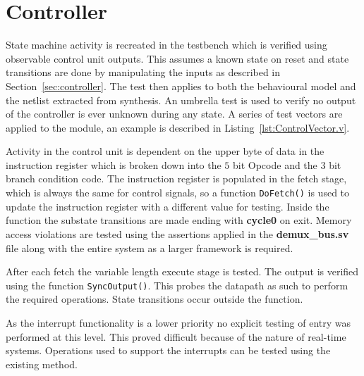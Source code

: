 
\section{Controller}

State machine activity is recreated in the testbench which is verified using observable control unit outputs.
This assumes a known state on reset and state transitions are done by manipulating the inputs as described in Section~\ref{sec:controller}.  
The test then applies to both the behavioural model and the netlist extracted from synthesis.
An umbrella test is used to verify no output of the controller is ever unknown during any state.
A series of test vectors are applied to the module, an example is described in Listing~\ref{lst:ControlVector.v}.




Activity in the control unit is dependent on the upper byte of data in the instruction register which is broken down into the $5$ bit Opcode and the $3$ bit branch condition code.  
The instruction register is populated in the fetch stage, which is always the same for control signals, so a function \texttt{DoFetch()} is used to update the instruction register with a different value for testing.
Inside the function the substate transitions are made ending with \textbf{cycle0} on exit.
Memory access violations are tested using the assertions applied in the \textbf{demux\_bus.sv} file along with the entire system as a larger framework is required.

After each fetch the variable length execute stage is tested.
The output is verified using the function \texttt{SyncOutput()}. 
This probes the datapath as such to perform the required operations.
State transitions occur outside the function.

As the interrupt functionality is a lower priority no explicit testing of entry was performed at this level.
This proved difficult because of the nature of real-time systems.
Operations used to support the interrupts can be tested using the existing method. 
